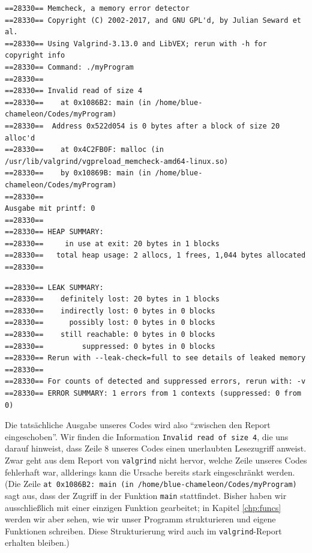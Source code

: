 \begin{cmdbox}
\begin{verbatim}
==28330== Memcheck, a memory error detector
==28330== Copyright (C) 2002-2017, and GNU GPL'd, by Julian Seward et al.
==28330== Using Valgrind-3.13.0 and LibVEX; rerun with -h for copyright info
==28330== Command: ./myProgram
==28330== 
==28330== Invalid read of size 4
==28330==    at 0x1086B2: main (in /home/blue-chameleon/Codes/myProgram)
==28330==  Address 0x522d054 is 0 bytes after a block of size 20 alloc'd
==28330==    at 0x4C2FB0F: malloc (in /usr/lib/valgrind/vgpreload_memcheck-amd64-linux.so)
==28330==    by 0x10869B: main (in /home/blue-chameleon/Codes/myProgram)
==28330== 
Ausgabe mit printf: 0
==28330== 
==28330== HEAP SUMMARY:
==28330==     in use at exit: 20 bytes in 1 blocks
==28330==   total heap usage: 2 allocs, 1 frees, 1,044 bytes allocated
==28330== 
\end{verbatim}
\end{cmdbox}

\begin{cmdbox}[]
\begin{verbatim}
==28330== LEAK SUMMARY:
==28330==    definitely lost: 20 bytes in 1 blocks
==28330==    indirectly lost: 0 bytes in 0 blocks
==28330==      possibly lost: 0 bytes in 0 blocks
==28330==    still reachable: 0 bytes in 0 blocks
==28330==         suppressed: 0 bytes in 0 blocks
==28330== Rerun with --leak-check=full to see details of leaked memory
==28330== 
==28330== For counts of detected and suppressed errors, rerun with: -v
==28330== ERROR SUMMARY: 1 errors from 1 contexts (suppressed: 0 from 0)
\end{verbatim}
\end{cmdbox}

Die tatsächliche Ausgabe unseres Codes wird also \enquote{zwischen den Report eingeschoben}. Wir finden die Information \texttt{Invalid read of size 4}, die uns darauf hinweist, dass Zeile 8 unseres Codes einen unerlaubten Lesezugriff anweist. Zwar geht aus dem Report von \texttt{valgrind} nicht hervor, welche Zeile unseres Codes fehlerhaft war, allderings kann die Ursache bereits stark eingeschränkt werden. (Die Zeile \texttt{at 0x1086B2: main (in /home/blue-chameleon/Codes/myProgram)} sagt aus, dass der Zugriff in der Funktion \texttt{main} stattfindet. Bisher haben wir ausschließlich mit einer einzigen Funktion gearbeitet; in Kapitel \ref{chp:funcs} werden wir aber sehen, wie wir unser Programm strukturieren und eigene Funktionen schreiben. Diese Strukturierung wird auch im \texttt{valgrind}-Report erhalten bleiben.)

